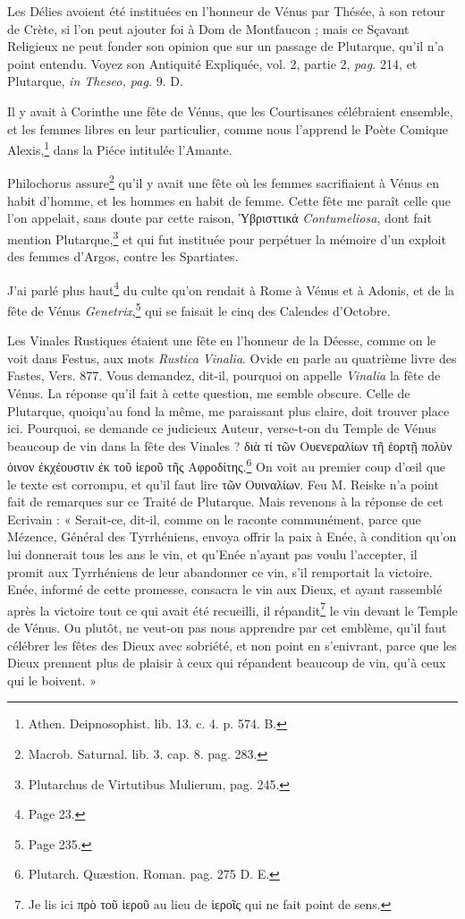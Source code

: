 \documentclass[a4paper, 11pt, oneside, polutonikogreek, french]{article}
\begin{document}
Les Délies avoient été instituées en l'honneur de Vénus par Thésée, à son retour de Crète, si l'on peut ajouter foi à Dom de Montfaucon ; mais ce Sçavant Religieux ne peut fonder son opinion que sur un passage de Plutarque, qu'il n'a point entendu. Voyez son Antiquité Expliquée, vol. 2, partie 2, \emph{pag.} 214, et Plutarque, \emph{in Theseo, pag.} 9. D.

Il y avait à Corinthe une fête de Vénus, que les Courtisanes célébraient ensemble, et les femmes libres en leur particulier, comme nous l'apprend le Poète Comique Alexis,\footnote{Athen. Deipnosophist. lib. 13. c. 4. p. 574. B.} dans la Piéce intitulée l'Amante.

Philochorus assure\footnote{Macrob. Saturnal. lib. 3. cap. 8. pag. 283.} qu'il y avait une fête où les femmes sacrifiaient à Vénus en habit d'homme, et les hommes en habit de femme. Cette fête me paraît celle que l'on appelait, sans doute par cette raison, Ὑβρισττικά \emph{Contumeliosa}, dont fait mention Plutarque,\footnote{Plutarchus de Virtutibus Mulierum, pag. 245.} et qui fut instituée pour perpétuer la mémoire d'un exploit des femmes d'Argos, contre les Spartiates.

J'ai parlé plus haut\footnote{Page 23.} du culte qu'on rendait à Rome à Vénus et à Adonis, et de la fête de Vénus \emph{Genetrix},\footnote{Page 235.} qui se faisait le cinq des Calendes d'Octobre.

Les Vinales Rustiques étaient une fête en l'honneur de la Déesse, comme on le voit dans Festus, aux mots \emph{Rustica Vinalia}. Ovide en parle au quatrième livre des Fastes, Vers. 877. Vous demandez, dit-il, pourquoi on appelle \emph{Vinalia} la fête de Vénus. La réponse qu'il fait à cette question, me semble obscure. Celle de Plutarque, quoiqu'au fond la même, me paraissant plus claire, doit trouver place ici. Pourquoi, se demande ce judicieux Auteur, verse-t-on du Temple de Vénus beaucoup de vin dans la fête des Vinales ? διὰ τί τῶν Ουενεραλίων τῆ ἑορτῇ πολὺν ὀινον ἐκχέουστιν ἐκ τοῦ ἱεροῦ τῆς Αφροδίτης.\footnote{Plutarch. Quæstion. Roman. pag. 275 D. E.} On voit au premier coup d'œil que le texte est corrompu, et qu'il faut lire τῶν Ουιναλίων. Feu M. Reiske n'a point fait de remarques sur ce Traité de Plutarque. Mais revenons à la réponse de cet Ecrivain : « Serait-ce, dit-il, comme on le raconte communément, parce que Mézence, Général des Tyrrhéniens, envoya offrir la paix à Enée, à condition qu'on lui donnerait tous les ans le vin, et qu'Enée n'ayant pas voulu l'accepter, il promit aux Tyrrhéniens de leur abandonner ce vin, s'il remportait la victoire. Enée, informé de cette promesse, consacra le vin aux Dieux, et ayant rassemblé après la victoire tout ce qui avait été recueilli, il répandit\footnote{Je lis ici πρὸ τοῦ ἱεροῦ au lieu de ἱεροῖς qui ne fait point de sens.} le vin devant le Temple de Vénus. Ou plutôt, ne veut-on pas nous apprendre par cet emblème, qu'il faut célébrer les fêtes des Dieux avec sobriété, et non point en s'enivrant, parce que les Dieux prennent plus de plaisir à ceux qui répandent beaucoup de vin, qu'à ceux qui le boivent. »
\end{document}
